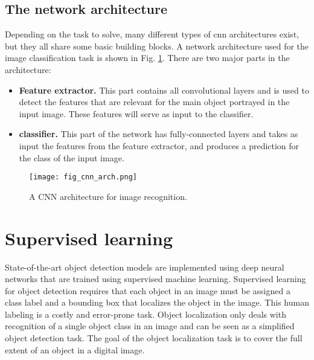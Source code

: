 \subsection{The network architecture}
Depending on the task to solve, many different types of \acrshort{cnn} architectures exist, but they all share some basic building blocks. A network architecture used for the image classification task is shown in Fig. \ref{fig:cnn_arch}. There are two major parts in the architecture:
\begin{itemize}
\item \textbf{Feature extractor.} This part contains all convolutional layers and is used to detect the features that are relevant for the main object portrayed in the input image. These features will serve as input to the classifier.
\item \textbf{classifier.} This part of the network has fully-connected layers and takes as input the features from the feature extractor, and produces a   prediction for the class of the input image.
\end{itemize}
\begin{figure}[ht]
    \begin{center}       
    \texttt{[image: fig\_cnn\_arch.png]}
    \caption{A CNN architecture for image recognition.}
    \label{fig:cnn_arch}
    \end{center}
\end{figure}

\section{Supervised learning}

State-of-the-art object detection models are implemented using deep neural networks that are trained using supervised machine learning. Supervised learning for object detection requires that each object in an image must be assigned a class label and a bounding box that localizes the object in the image. This human labeling is a costly and error-prone task. Object localization only deals with recognition of a single object class in an image and can be seen as a simplified object detection task. The goal of the object localization task is to cover the full extent of an object in a digital image.



